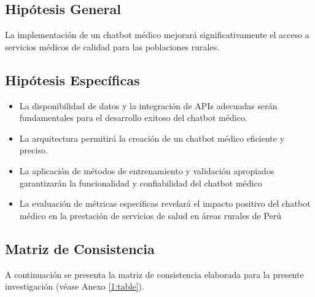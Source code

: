 \subsection{Hipótesis General}
\newcommand{\HipotesisGeneral}{
La implementación de un chatbot médico mejorará significativamente el acceso a servicios médicos de calidad para las poblaciones rurales.
}
\HipotesisGeneral
\subsection{Hipótesis Específicas}
\newcommand{\Hone}{
La disponibilidad de datos y la integración de APIs adecuadas serán fundamentales para el desarrollo exitoso del chatbot médico.
}
\newcommand{\Htwo}{
La arquitectura permitirá la creación de un chatbot médico eficiente y preciso.
}
\newcommand{\Hthree}{
La aplicación de métodos de entrenamiento y validación apropiados garantizarán la funcionalidad y confiabilidad del chatbot médico
}
\newcommand{\Hfour}{
La evaluación de métricas específicas revelará el impacto positivo del chatbot médico en la prestación de servicios de salud en áreas rurales de Perú
}
\begin{itemize}
	\item \Hone
	\item \Htwo
	\item \Hthree
	\item \Hfour

\end{itemize}

\subsection{Matriz de Consistencia}
A continuación se presenta la matriz de consistencia elaborada para la presente investigación (véase Anexo \ref{1:table}).

